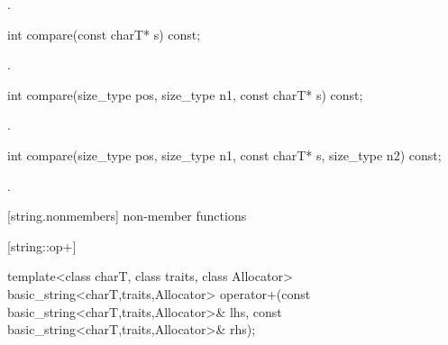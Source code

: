 \begin{itemdescr}
\pnum
\returns {}.
\end{itemdescr}

%
%
\begin{itemdecl}
int compare(const charT* s) const;
\end{itemdecl}

\begin{itemdescr}
\pnum
\returns
{}.
\end{itemdescr}

%
%
\begin{itemdecl}
int compare(size_type pos, size_type n1,
            const charT* s) const;
\end{itemdecl}

\begin{itemdescr}
\pnum
\returns {}.
\end{itemdescr}

%
%
\begin{itemdecl}
int compare(size_type pos, size_type n1,
            const charT* s, size_type n2) const;
\end{itemdecl}

\begin{itemdescr}
\pnum
\returns {}.
\end{itemdescr}

[string.nonmembers]{ non-member functions}


[string::op+]{}

%
%
\begin{itemdecl}
template<class charT, class traits, class Allocator>
  basic_string<charT,traits,Allocator>
    operator+(const basic_string<charT,traits,Allocator>& lhs,
              const basic_string<charT,traits,Allocator>& rhs);
\end{itemdecl}

